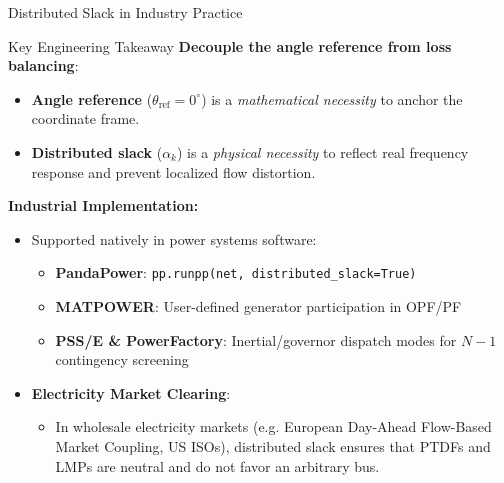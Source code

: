 \begin{frame}[allowframebreaks]{Distributed Slack in Industry Practice}
    \begin{block}{Key Engineering Takeaway}
        \textbf{Decouple the angle reference from loss balancing}:
        \begin{itemize}
            \item \textbf{Angle reference} ($\theta_{\text{ref}} = 0^\circ$) is a \textit{mathematical necessity} to anchor the coordinate frame.
            \item \textbf{Distributed slack} ($\alpha_k$) is a \textit{physical necessity} to reflect real frequency response and prevent localized flow distortion.
        \end{itemize}
    \end{block}
    
    \newpage
    \textbf{Industrial Implementation:}
    \begin{itemize}
        \item Supported natively in power systems software:
        \begin{itemize}
            \item \textbf{PandaPower}: \texttt{pp.runpp(net, distributed\_slack=True)}
            \item \textbf{MATPOWER}: User-defined generator participation in OPF/PF
            \item \textbf{PSS/E \& PowerFactory}: Inertial/governor dispatch modes for $N-1$ contingency screening
        \end{itemize}
        \vspace{0.15cm}
        \item \textbf{Electricity Market Clearing}:
        \begin{itemize}
            \item In wholesale electricity markets (e.g. European Day-Ahead Flow-Based Market Coupling, US ISOs), distributed slack ensures that PTDFs and LMPs are neutral and do not favor an arbitrary bus.
        \end{itemize}
    \end{itemize}
\end{frame}



